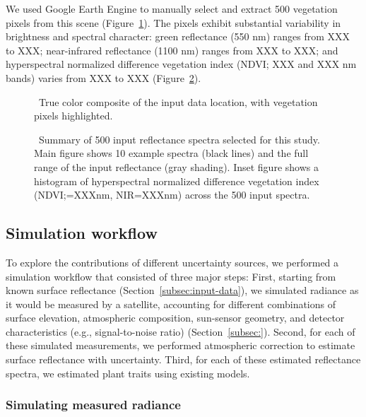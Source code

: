 \documentclass[draft]{agujournal2019}
\begin{document}
\fussy  %
We used Google Earth Engine to manually select and extract 500 vegetation pixels from this scene (Figure~\ref{fig:sitemap}).
The pixels exhibit substantial variability in brightness and spectral character:
green reflectance (550 nm) ranges from XXX to XXX;
near-infrared reflectance (1100 nm) ranges from XXX to XXX;
and hyperspectral normalized difference vegetation index (NDVI; XXX and XXX nm bands) varies from XXX to XXX (Figure~\ref{fig:input-summary}).

\begin{figure}[ht]
  \centering
  \caption{\label{fig:sitemap} \
    True color composite of the input data location, with vegetation pixels highlighted.
  }
\end{figure}

\begin{figure}[ht]
  \centering
  \caption{\label{fig:input-summary} \
    Summary of 500 input reflectance spectra selected for this study.
    Main figure shows 10 example spectra (black lines) and the full range of the input reflectance (gray shading).
    Inset figure shows a histogram of hyperspectral normalized difference vegetation index (NDVI;\@red=XXXnm, NIR=XXXnm) across the 500 input spectra.
  }
\end{figure}


\subsection{Simulation workflow}\label{subsec:workflow}

To explore the contributions of different uncertainty sources, we performed a simulation workflow that consisted of three major steps:
First, starting from known surface reflectance (Section~\ref{subsec:input-data}), we simulated radiance as it would be measured by a satellite, accounting for different combinations of surface elevation, atmospheric composition, sun-sensor geometry, and detector characteristics (e.g., signal-to-noise ratio) (Section~\ref{subsec:}).
Second, for each of these simulated measurements, we performed atmospheric correction to estimate surface reflectance with uncertainty.
Third, for each of these estimated reflectance spectra, we estimated plant traits using existing models.

\subsubsection{Simulating measured radiance}\label{subsubsec:radiance}
\end{document}
